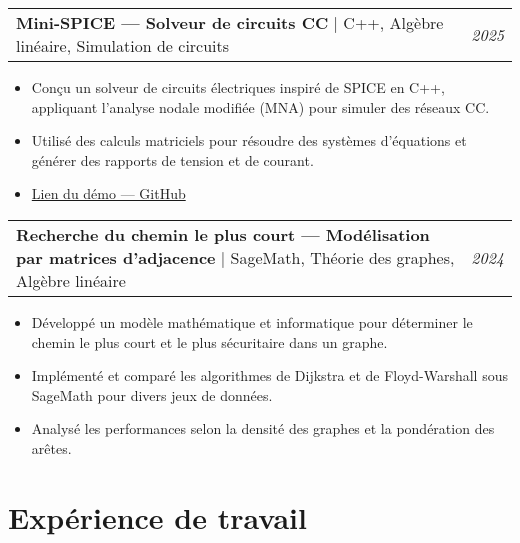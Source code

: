\documentclass[a4paper,12pt]{article}
\begin{document}
\vspace{0.8em}

\begin{tabularx}{\linewidth}{@{}X r@{}}
\textbf{Mini-SPICE — Solveur de circuits CC} | C++, Algèbre linéaire, Simulation de circuits & \textit{2025} \\
\end{tabularx}
\begin{itemize}[leftmargin=1em]
    \item Conçu un solveur de circuits électriques inspiré de SPICE en C++, appliquant l’analyse nodale modifiée (MNA) pour simuler des réseaux CC.
    \item Utilisé des calculs matriciels pour résoudre des systèmes d’équations et générer des rapports de tension et de courant.
    \item \href{https://github.com/AbderrahmaneErraqabi/mini-spice-dc}{Lien du démo — GitHub}
\end{itemize}

\vspace{0.8em}

\begin{tabularx}{\linewidth}{@{}X r@{}}
\textbf{Recherche du chemin le plus court — Modélisation par matrices d’adjacence} | SageMath, Théorie des graphes, Algèbre linéaire & \textit{2024} \\
\end{tabularx}
\begin{itemize}[leftmargin=1em]
    \item Développé un modèle mathématique et informatique pour déterminer le chemin le plus court et le plus sécuritaire dans un graphe.
    \item Implémenté et comparé les algorithmes de Dijkstra et de Floyd-Warshall sous SageMath pour divers jeux de données.
    \item Analysé les performances selon la densité des graphes et la pondération des arêtes.
\end{itemize}
\vspace{1.2em}


\section{Expérience de travail}
\end{document}
